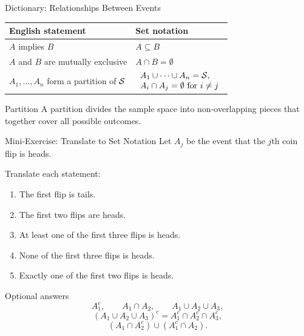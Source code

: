 \begin{frame}{Dictionary: Relationships Between Events}
\begin{center}
\begin{tabular}{ll}
\toprule
English statement & Set notation \\
\midrule
$A$ implies $B$ & $A \subseteq B$ \\
$A$ and $B$ are mutually exclusive & $A \cap B = \emptyset$ \\
$A_1,\dots,A_n$ form a partition of $\mathcal{S}$ &
$\begin{array}{l}
A_1 \cup \cdots \cup A_n = \mathcal{S},\\
A_i \cap A_j = \emptyset \text{ for } i \ne j
\end{array}$ \\
\bottomrule
\end{tabular}
\end{center}

\vspace{0.3cm}

\begin{keybox}{Partition}
A partition divides the sample space into non-overlapping pieces that together cover all possible outcomes.
\end{keybox}
\end{frame}

\begin{frame}{Mini-Exercise: Translate to Set Notation}
Let $A_j$ be the event that the $j$th coin flip is heads.

Translate each statement:

\begin{enumerate}
    \item The first flip is tails.
    \item The first two flips are heads.
    \item At least one of the first three flips is heads.
    \item None of the first three flips is heads.
    \item Exactly one of the first two flips is heads.
\end{enumerate}

\vspace{0.25cm}

\begin{livebox}{Optional answers}
\[
A_1^c,\qquad
A_1 \cap A_2,\qquad
A_1 \cup A_2 \cup A_3,
\]
\[
(A_1 \cup A_2 \cup A_3)^c
=
A_1^c \cap A_2^c \cap A_3^c,
\]
\[
(A_1 \cap A_2^c) \cup (A_1^c \cap A_2).
\]
\end{livebox}
\end{frame}

